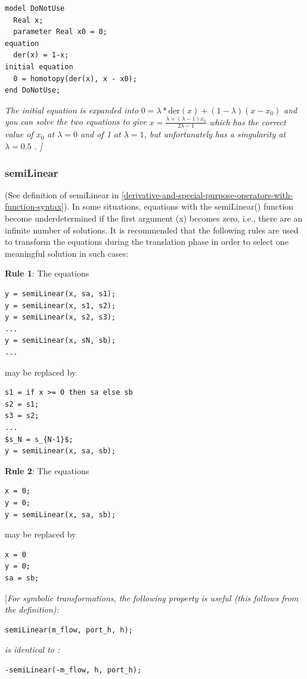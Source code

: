 \documentclass[10pt,a4paper]{report}
\def\doublelabel#1{\label{#1}}
\begin{document}
\begin{lstlisting}[language=modelica]
model DoNotUse
  Real x;
  parameter Real x0 = 0;
equation
  der(x) = 1-x;
initial equation
  0 = homotopy(der(x), x - x0);
end DoNotUse;
\end{lstlisting}

\emph{The initial equation is expanded into}
$ 0 = \lambda*\mathrm{der}(x)+(1-\lambda)(x-x_0)$
\emph{and you can solve the two equations to give}
$ x=\frac{\lambda+(\lambda-1)x_0}{2\lambda-1}$
\emph{which has the correct value of $x_0$ at $\lambda = 0$ and of 1 at $\lambda= 1$, but unfortunately has a singularity at $\lambda = 0.5 $ .}
\emph{{]}}

\subsubsection{semiLinear}\doublelabel{semilinear}

(See definition of semiLinear in \ref{derivative-and-special-purpose-operators-with-function-syntax}). In some situations,
equations with the semiLinear() function become underdetermined if the
first argument (x) becomes zero, i.e., there are an infinite number of
solutions. It is recommended that the following rules are used to
transform the equations during the translation phase in order to select
one meaningful solution in such cases:

\textbf{Rule 1}: The equations

\begin{lstlisting}[language=modelica]
y = semiLinear(x, sa, s1);
y = semiLinear(x, s1, s2);
y = semiLinear(x, s2, s3);
...
y = semiLinear(x, sN, sb);
...
\end{lstlisting}

may be replaced by
\begin{lstlisting}[language=modelica, mathescape=true]
s1 = if x >= 0 then sa else sb
s2 = s1;
s3 = s2;
...
$s_N = s_{N-1}$;
y = semiLinear(x, sa, sb);
\end{lstlisting}

\textbf{Rule 2}: The equations
\begin{lstlisting}[language=modelica]
x = 0;
y = 0;
y = semiLinear(x, sa, sb);
\end{lstlisting}

may be replaced by
\begin{lstlisting}[language=modelica]
x = 0
y = 0;
sa = sb;
\end{lstlisting}

{[}\emph{For symbolic transformations, the following property is useful
(this follows from the definition):}
\begin{lstlisting}[language=modelica]
semiLinear(m_flow, port_h, h);
\end{lstlisting}
\emph{is identical to :}
\begin{lstlisting}[language=modelica]
-semiLinear(-m_flow, h, port_h);
\end{lstlisting}
\end{document}
